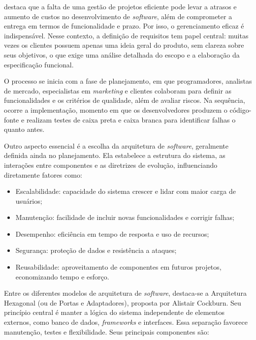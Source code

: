\documentclass[english,brazilian]{UNISINOSartigo} %
\begin{document}
 destaca que a falta de uma gestão de projetos eficiente pode levar a atrasos e aumento de custos no desenvolvimento de \textit{software}, além de comprometer a entrega em termos de funcionalidade e prazo. Por isso, o gerenciamento eficaz é indispensável. Nesse contexto, a definição de requisitos tem papel central: muitas vezes os clientes possuem apenas uma ideia geral do produto, sem clareza sobre seus objetivos, o que exige uma análise detalhada do escopo e a elaboração da especificação funcional.

O processo se inicia com a fase de planejamento, em que programadores, analistas de mercado, especialistas em \textit{marketing} e clientes colaboram para definir as funcionalidades e os critérios de qualidade, além de avaliar riscos. Na sequência, ocorre a implementação, momento em que os desenvolvedores produzem o código-fonte e realizam testes de caixa preta e caixa branca para identificar falhas o quanto antes.

Outro aspecto essencial é a escolha da arquitetura de \textit{software}, geralmente definida ainda no planejamento. Ela estabelece a estrutura do sistema, as interações entre componentes e as diretrizes de evolução, influenciando diretamente fatores como:

\begin{itemize}[leftmargin=1cm, itemsep=0.1em, topsep=0.1em]
    \item Escalabilidade: capacidade do sistema crescer e lidar com maior carga de usuários;
    \item Manutenção: facilidade de incluir novas funcionalidades e corrigir falhas;
    \item Desempenho: eficiência em tempo de resposta e uso de recursos;
    \item Segurança: proteção de dados e resistência a ataques;
    \item Reusabilidade: aproveitamento de componentes em futuros projetos, economizando tempo e esforço.
\end{itemize}

Entre os diferentes modelos de arquitetura de \textit{software}, destaca-se a Arquitetura Hexagonal (ou de Portas e Adaptadores), proposta por Alistair Cockburn. Seu princípio central é manter a lógica do sistema independente de elementos externos, como banco de dados, \textit{frameworks} e interfaces. Essa separação favorece manutenção, testes e flexibilidade. Seus principais componentes são:
\end{document}
